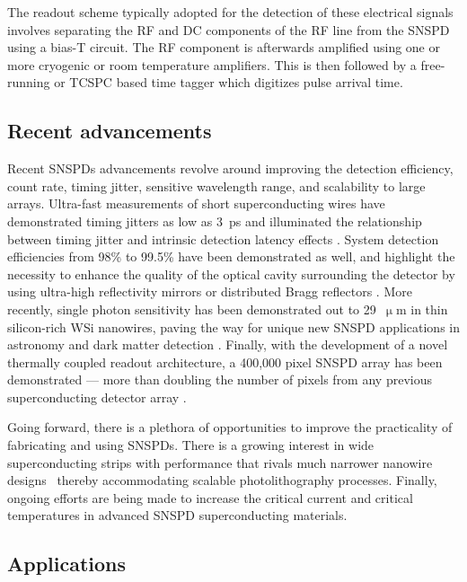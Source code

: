 \documentclass[11pt]{caltech_thesis} %
\begin{document}
The readout scheme typically adopted for the detection of these electrical signals involves separating the RF and DC components of the RF line from the SNSPD using a bias-T circuit. The RF component is afterwards amplified using one or more cryogenic or room temperature amplifiers. This is then followed by a free-running or TCSPC based time tagger which digitizes pulse arrival time.

\hypertarget{recent-advancements}{%
\subsection{Recent advancements}\label{recent-advancements}}

Recent SNSPDs advancements revolve around improving the detection efficiency, count rate, timing jitter, sensitive wavelength range, and scalability to large arrays. Ultra-fast measurements of short superconducting wires have demonstrated timing jitters as low as 3~ps and illuminated the relationship between timing jitter and intrinsic detection latency effects \autocite{Korzh2020}. System detection efficiencies from 98\% to 99.5\% have been demonstrated as well, and highlight the necessity to enhance the quality of the optical cavity surrounding the detector by using ultra-high reflectivity mirrors or distributed Bragg reflectors \autocite{reddy2020superconducting,99.5_Chang_2021}. More recently, single photon sensitivity has been demonstrated out to 29~$\upmu \mathrm{m}$ in thin silicon-rich WSi nanowires, paving the way for unique new SNSPD applications in astronomy and dark matter detection \autocite{taylor2023lownoise}. Finally, with the development of a novel thermally coupled readout architecture, a 400,000 pixel SNSPD array has been demonstrated --- more than doubling the number of pixels from any previous superconducting detector array \autocite{Oripov2023}.

Going forward, there is a plethora of opportunities to improve the practicality of fabricating and using SNSPDs. There is a growing interest in wide superconducting strips with performance that rivals much narrower nanowire designs~\autocite{Yabuno:23} thereby accommodating scalable photolithography processes. Finally, ongoing efforts are being made to increase the critical current and critical temperatures in advanced SNSPD superconducting materials.

\hypertarget{applications}{%
\subsection{Applications}\label{applications}}
\end{document}
